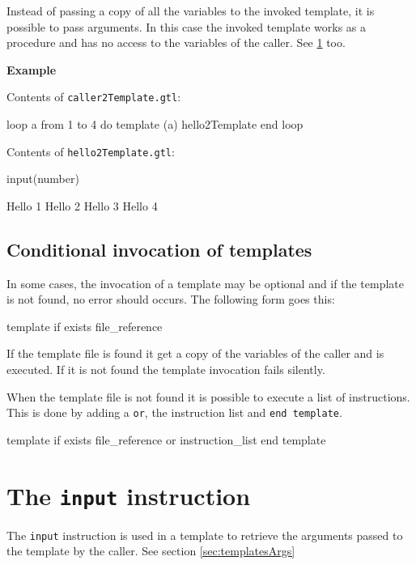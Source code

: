 \documentclass[10pt,openright,twosides,final]{memoir}
\newcommand{\gtlinline}[1]{\colorbox{light-blue}{\lstinline[language=gtl]{#1}}}
\newcommand{\example}{\vspace{.75em}\noindent\textbf{Example}\vspace{0em}}
\begin{document}
Instead of passing a copy of all the variables to the invoked template, it is possible to pass arguments. In this case the invoked template works as a procedure and has no access to the variables of the caller. See \ref{sec:input} too.

\example

\noindent Contents of \texttt{\small caller2Template.gtl}:
\begin{gtl}
loop a from 1 to 4 do
  template (a) hello2Template 
end loop
%
%
\end{gtl}
\noindent Contents of \texttt{\small hello2Template.gtl}:
\begin{gtl}
input(number)
\end{gtl}

\begin{templateoutput}
Hello 1 Hello 2 Hello 3 Hello 4 
\end{templateoutput}

\subsection{Conditional invocation of templates}

In some cases, the invocation of a template may be optional and if the template is not found, no error should occurs. The following form goes this:

\begin{gtl}
template if exists file_reference
\end{gtl}

If the template file is found it get a copy of the variables of the caller and is executed. If it is not found the template invocation fails silently.

When the template file is not found it is possible to execute a list of instructions. This is done by adding a \gtlinline{or}, the instruction list and \gtlinline{end template}.

\begin{gtl}
template if exists file_reference or
  instruction_list
end template
\end{gtl}

\section{The \texttt{input} instruction}
\label{sec:input}

The \gtlinline{input} instruction is used in a template to retrieve the arguments passed to the template by the caller. See section \ref{sec:templatesArgs}
\end{document}
